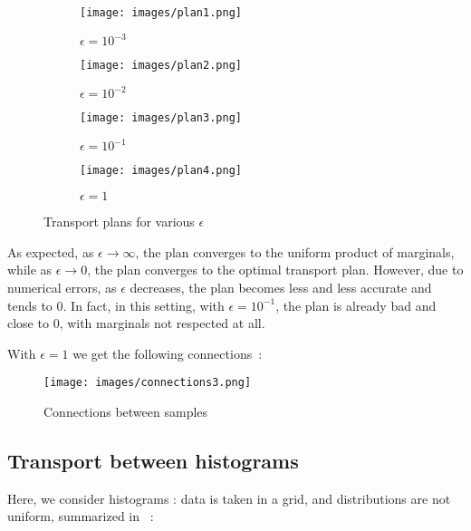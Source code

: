 \documentclass[a4paper,11pt]{article}
\newcommand{\1}{\mathbbm{1}}
\begin{document}
\begin{figure}[H]
    \centering
    \begin{subfigure}{0.2\linewidth}
        \centering
        \texttt{[image: images/plan1.png]}
        \caption{$\epsilon = 10^{-3}$}
        \label{fig:plan1}
    \end{subfigure}
    \hfill
    \begin{subfigure}{0.2\linewidth}
        \centering
        \texttt{[image: images/plan2.png]}
        \caption{$\epsilon = 10^{-2}$}
        \label{fig:plan2}
    \end{subfigure}
    \hfill
    \begin{subfigure}{0.2\linewidth}
        \centering
        \texttt{[image: images/plan3.png]}
        \caption{$\epsilon = 10^{-1}$}
        \label{fig:plan3}
    \end{subfigure}
    \hfill
    \begin{subfigure}{0.2\linewidth}
        \centering
        \texttt{[image: images/plan4.png]}
        \caption{$\epsilon = 1$}
        \label{fig:plan4}
    \end{subfigure}
    \caption{Transport plans for various $\epsilon$}
    \label{fig:plans}
\end{figure}

As expected, as $\epsilon \rightarrow \infty$, the plan converges to the uniform product of marginals, while as $\epsilon \rightarrow 0$, the plan converges to the optimal transport plan. However, due to numerical errors, as $\epsilon$ decreases, the plan becomes less and less accurate and tends to $0$. In fact, in this setting, with $\epsilon = 10^{-1}$, the plan is already bad and close to $0$, with marginals not respected at all.

With $\epsilon = 1$ we get the following connections~:

\begin{figure}[H]
    \centering
    \texttt{[image: images/connections3.png]}
    \caption{Connections between samples}
    \label{fig:connections3}
\end{figure}

\subsection{Transport between histograms}

Here, we consider histograms : data is taken in a grid, and distributions are not uniform, summarized in ~:
\end{document}
